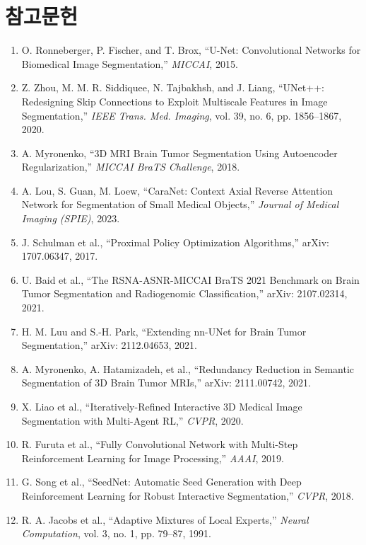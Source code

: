 \documentclass[11pt,a4paper]{article}
\begin{document}
\section*{참고문헌}
\begin{enumerate}
    \item[1] O. Ronneberger, P. Fischer, and T. Brox, ``U-Net: Convolutional Networks for Biomedical Image Segmentation,'' \textit{MICCAI}, 2015.
    \item[2] Z. Zhou, M. M. R. Siddiquee, N. Tajbakhsh, and J. Liang, ``UNet++: Redesigning Skip Connections to Exploit Multiscale Features in Image Segmentation,'' \textit{IEEE Trans. Med. Imaging}, vol. 39, no. 6, pp. 1856--1867, 2020.
    \item[3] A. Myronenko, ``3D MRI Brain Tumor Segmentation Using Autoencoder Regularization,'' \textit{MICCAI BraTS Challenge}, 2018.
    \item[4] A. Lou, S. Guan, M. Loew, ``CaraNet: Context Axial Reverse Attention Network for Segmentation of Small Medical Objects,'' \textit{Journal of Medical Imaging (SPIE)}, 2023.
    \item[5] J. Schulman et al., ``Proximal Policy Optimization Algorithms,'' arXiv: 1707.06347, 2017.
    \item[6] U. Baid et al., ``The RSNA-ASNR-MICCAI BraTS 2021 Benchmark on Brain Tumor Segmentation and Radiogenomic Classification,'' arXiv: 2107.02314, 2021.
    \item[7] H. M. Luu and S.-H. Park, ``Extending nn-UNet for Brain Tumor Segmentation,'' arXiv: 2112.04653, 2021.
    \item[8] A. Myronenko, A. Hatamizadeh, et al., ``Redundancy Reduction in Semantic Segmentation of 3D Brain Tumor MRIs,'' arXiv: 2111.00742, 2021.
    \item[9] X. Liao et al., ``Iteratively-Refined Interactive 3D Medical Image Segmentation with Multi-Agent RL,'' \textit{CVPR}, 2020.
    \item[10] R. Furuta et al., ``Fully Convolutional Network with Multi-Step Reinforcement Learning for Image Processing,'' \textit{AAAI}, 2019.
    \item[11] G. Song et al., ``SeedNet: Automatic Seed Generation with Deep Reinforcement Learning for Robust Interactive Segmentation,'' \textit{CVPR}, 2018.
    \item[12] R. A. Jacobs et al., ``Adaptive Mixtures of Local Experts,'' \textit{Neural Computation}, vol. 3, no. 1, pp. 79--87, 1991.
\end{enumerate}
\end{document}
